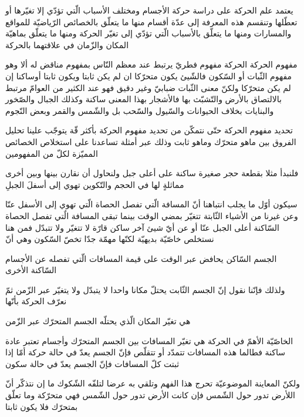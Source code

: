 يعتمد علم الحركة على دراسة حركة الأجسام ومختلف الأسباب الّتي تؤدّي إلا تغيّرها أو تعطّلها وتنقسم هذه المعرفة إلى عدّة أقسام منها ما يتعلّق بالخصائص الرّياضيّة للمواقع والمسارات ومنها ما يتعلّق بالأسباب الّتي تؤدّي إلى تغيّر الحركة ومنها ما يتعلّق بماهيّة المكان والزّمان في علاقتهما بالحركة
\begin{section}{مفهوم الحركة}
الحركة مفهوم فطريّ يرتبط عند معظم النّاس بمفهوم مناقض له ألا وهو مفهوم الثّبات أو السّكون فالشّيئ يكون متحرّكا ان لم يكن ثابتا ويكون ثابتا أوساكنا إن لم يكن متحرّكا ولكنّ معنى الثّبات ضبابيّ وغير دقيق فهو عند الكثير من العوامّ مرتبط بالالتصاق بالأرض والتّشبّث بها فالأشجار بهذا المعنى ساكنة وكذلك الجبال والصّخور والبنايات بخلاف الحيوانات والسّيول والسّحب بل والشّمس والقمر وبعض النّجوم

\begin{subsection}{تحديد مفهوم الحركة}
حتّى نتمكّن من تحديد مفهوم الحركة بأكثر قّة يتوجّب علينا تحليل الفروق بين ماهو متحرّك وماهو ثابت وذلك عبر أمثلة تساعدنا على استخلاص الخصائص المميّزة لكلّ من المفهومين

فلنبدأ مثلا بقطعة حجر صغيرة ساكنة على أعلى جبل ولنحاول أن نقارن بينها وبين أخرى مماثلةٍ لها في الحجم والتّكوين تهوي إلى أسفلَ الجبلِ

سيكون أوّل ما يجلب انتباهنا أنّ المسافة الّتي تفصل الحصاة الّتي تهوي إلى الأسفل عنّا وعن غيرنا من الأشياء الثّابتة تتغيّر بمضي الوقت بينما تبقى المسافة الٌتي تفصل الحصاة السّاكنة أعلى الجبل عنّا أو عن أيّ شيئ آخر ساكن قارّة لا تتغيّر ولا تتبدّل فمن هنا نستخلص خاصّيّة بديهيّة لكنّها مهمّة جدّا تخصّ السّكون وهي أنّ
\begin{property}
الجسم السّاكن يحافض عبر الوقت على قيمة المسافات الّتي تفصله عن الأجسام السّاكنة الأخرى
\end{property}
ولذلك فإنّنا نقول إنّ الجسم الثّابت يحتلّ مكانا واحدا لا يتبدّل ولا يتغيّر عبر الزّمن ثمّ نعرّف الحركة بأنّها
\begin{definition}[الحركة]
هي تغيّر المكان الّذي يحتلّه الجسم المتحرّك عبر الزّمن
\end{definition}
\end{subsection}
الخاصّيّة الأهمّ في الحركة هي تغيّر المسافات بين الجسم المتحرّك وأجسام تعتبر عادة ساكنة فطالما هذه المسافات تتمدّد أو تتقلّص فإنّ الجسم يعدّ في حالة حركة أمّا إذا ثبتت كلّ المسافات فإنّ الجسم يعدّ في حالة سكون

ولكنّ المعاينة الموضوعيّة تحرج هذا الفهم وتلقي به عرضا لتلفّه الشّكوك ما إن نتذكّر أنّ اللأرض تدور حول الشّمس فإن كانت الأرض تدور حول الشّمس فهي متحرّكة وما تعلّق بمتحرّك فلا يكون ثابتا


\end{section}
